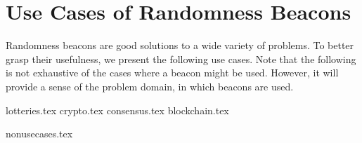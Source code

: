 \section{Use Cases of Randomness Beacons}\label{sec:use_cases_of_randomness_beacons}
Randomness beacons are good solutions to a wide variety of problems.
To better grasp their usefulness, we present the following use cases.
Note that the following is not exhaustive of the cases where a beacon might be used.
However, it will provide a sense of the problem domain, in which beacons are used.

{lotteries.tex}
{crypto.tex}
{consensus.tex}
{blockchain.tex}

{nonusecases.tex}

